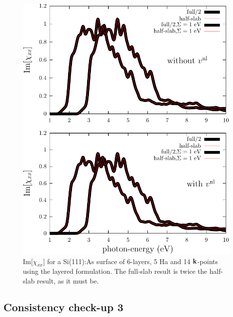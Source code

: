 \begin{figure}[b]
\centering
\includegraphics[scale=.7]{plots/surface-chi}
\caption{Im[$\chi_{xx}$] 
for a Si(111):As surface of 6-layers, 5 Ha and 14 $\mathbf{k}$-points using
the layered formulation. 
The full-slab result is twice the half-slab
result, as it must be.
}
\label{si111as}
\end{figure}

\subsection{Consistency check-up 3}

